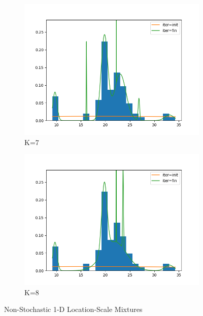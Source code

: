 \begin{figure}
     \begin{subfigure}[b]{0.3\textwidth}
         \centering
         \includegraphics[width=\textwidth]{../code/regular_loc_scale_plots/galaxies_hist_k_7.png}
         \caption{K=7}
         \label{fig:Reg_loc_scale7}
     \end{subfigure}
     \hfill
     \begin{subfigure}[b]{0.3\textwidth}
         \centering
         \includegraphics[width=\textwidth]{../code/regular_loc_scale_plots/galaxies_hist_k_8.png}
         \caption{K=8}
         \label{fig:Reg_loc_scale8}
     \end{subfigure}
        \caption{Non-Stochastic 1-D Location-Scale Mixtures}
        \label{fig:Reg_loc_scale}
\end{figure}
